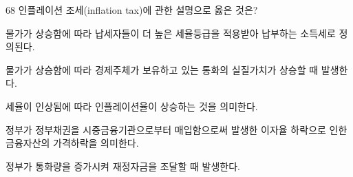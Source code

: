 \begin{question}{68}
인플레이션 조세(inflation tax)에 관한 설명으로 옳은 것은?
\begin{choices}
  \item 물가가 상승함에 따라 납세자들이 더 높은 세율등급을 적용받아 납부하는 소득세로 정의된다.
  \item 물가가 상승함에 따라 경제주체가 보유하고 있는 통화의 실질가치가 상승할 때 발생한다.
  \item 세율이 인상됨에 따라 인플레이션율이 상승하는 것을 의미한다.
  \item 정부가 정부채권을 시중금융기관으로부터 매입함으로써 발생한 이자율 하락으로 인한 금융자산의 가격하락을 의미한다.
  \item 정부가 통화량을 증가시켜 재정자금을 조달할 때 발생한다.
\end{choices}
\end{question}
